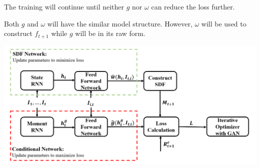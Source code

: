 \documentclass[11pt, oneside]{article}   	%
\begin{document}
The training will continue until neither $g$ nor
$\omega$ can reduce the loss further.

Both $g$ and $\omega$ will have the similar model structure.
However, $\omega$ will be used to construct $f_{t+1}$ while $g$ will be in its raw form.

\includegraphics[width=\textwidth]{./reference_paper/img/model}
\end{document}
